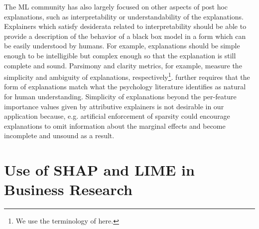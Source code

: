 \documentclass[12pt]{article}  %
\begin{document}
  The ML community has also largely focused on other aspects of post hoc explanations, such as interpretability or understandability of the explanations. Explainers which satisfy desiderata related to interpretability should be able to provide a description of the behavior of a black box model in a form which can be easily understood by humans. For example, explanations should be simple enough to be intelligible but complex enough so that the explanation is still complete and sound. Parsimony \citep{nguyen2020quantitative} and clarity \citep{lakkaraju2017interpretable,montavon2018methods,alvarez18robustness} metrics, for example, measure the simplicity and ambiguity of explanations, respectively\footnote{We use the terminology of \cite{markus2021role} here.}. \cite{jacovi2023diagnosing} further requires that the form of explanations match what the psychology literature identifies as natural for human understanding.  Simplicity of explanations beyond the per-feature importance values given by attributive explainers is not desirable in our application because, e.g. artificial enforcement of sparsity could encourage explanations to omit information about the marginal effects and become incomplete and unsound as a result. %

    
   
    
    
    \section{Use of SHAP and LIME in Business Research}
        \label{sec:use_in_b_research}
\end{document}
